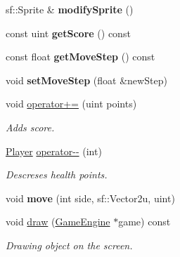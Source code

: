 \begin{DoxyCompactItemize}
sf\+::\+Sprite \& {\bfseries modify\+Sprite} ()
\item 
\mbox{\label{class_player_a5e084d1d883eeade8a73df72cdd855be}} 
const uint {\bfseries get\+Score} () const
\item 
\mbox{\label{class_player_afb255210e4ca1d463c18b4a5aa26a1e0}} 
const float {\bfseries get\+Move\+Step} () const
\item 
\mbox{\label{class_player_a658ca673f68b8ba14f888b313f2f8fd3}} 
void {\bfseries set\+Move\+Step} (float \&new\+Step)
\item 
\mbox{\label{class_player_a234802f1731a329b697fde399a20d0ad}} 
void \mbox{\hyperlink{class_player_a234802f1731a329b697fde399a20d0ad}{operator+=}} (uint points)
\begin{DoxyCompactList}\small\item\em Adds score. \end{DoxyCompactList}\item 
\mbox{\label{class_player_ac56de355f4f7079ddc994ea16f05cda2}} 
\mbox{\hyperlink{class_player}{Player}} \mbox{\hyperlink{class_player_ac56de355f4f7079ddc994ea16f05cda2}{operator-\/-\/}} (int)
\begin{DoxyCompactList}\small\item\em Descreses health points. \end{DoxyCompactList}\item 
\mbox{\label{class_player_aef0d42bebee03ea367cc38d07d614536}} 
void {\bfseries move} (int side, sf\+::\+Vector2u, uint)
\item 
\mbox{\label{class_player_aaa0642fde01a4db5e9ee95693805ecda}} 
void \mbox{\hyperlink{class_player_aaa0642fde01a4db5e9ee95693805ecda}{draw}} (\mbox{\hyperlink{class_game_engine}{Game\+Engine}} $\ast$game) const
\begin{DoxyCompactList}\small\item\em Drawing object on the screen. \end{DoxyCompactList}\end{DoxyCompactItemize}
